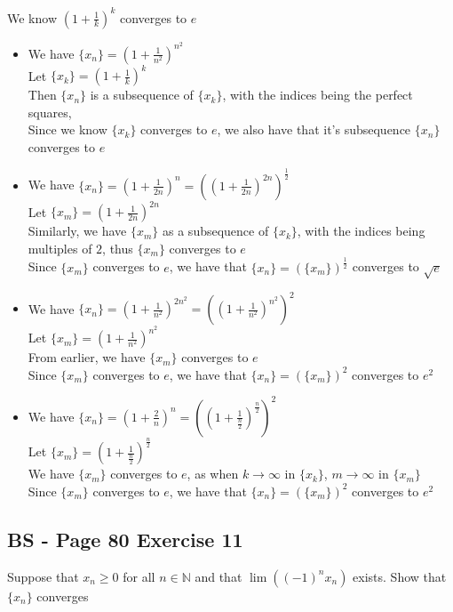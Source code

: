 \documentclass{article}
\begin{document}
We know \((1+\frac{1}{k})^k\) converges to \(e\)
\begin{itemize}
    \item We have \(\{x_n\} = (1+\frac{1}{n^2})^{n^2}\)
    \\
    Let \(\{x_k\} = (1+ \frac{1}{k})^k\) \\
    Then \(\{x_n\}\) is a subsequence of \(\{x_k\}\), with the indices being the perfect squares,
    \\ 
    Since we know \(\{x_k\}\) converges to \(e\), we also have that it's subsequence \(\{x_n\}\) converges to \(e\)

    \item We have \(\{x_n\} = (1+ \frac{1}{2n})^n = ((1+ \frac{1}{2n})^{2n})^{\frac{1}{2}}\)
    \\
    Let \(\{x_m\} = (1+ \frac{1}{2n})^{2n}\)
    \\
    Similarly, we have \(\{x_m\}\) as a subsequence of \(\{x_k\}\), with the indices being
    multiples of \(2\), thus \(\{x_m\}\) converges to \(e\)
    \\
    Since \(\{x_m\}\) converges to \(e\), we have that \(\{x_n\} = (\{x_m\})^{\frac{1}{2}}\) converges to \(\sqrt{e}\)

    \item We have \(\{x_n\} = (1+ \frac{1}{n^2})^{2n^2} = ((1+ \frac{1}{n^2})^{n^2})^{2}\)
    \\
    Let \(\{x_m\} = (1+ \frac{1}{n^2})^{n^2}\)
    \\
    From earlier, we have \(\{x_m\}\) converges to \(e\)
    \\
    Since \(\{x_m\}\) converges to \(e\), we have that \(\{x_n\} = (\{x_m\})^2\) converges to \(e^2\)

    \item We have \(\{x_n\} = (1+ \frac{2}{n})^n = ((1+ \frac{1}{\frac{n}{2}})^{\frac{n}{2}})^2\)
    \\
    Let \(\{x_m\} = (1+ \frac{1}{\frac{n}{2}})^{\frac{n}{2}}\)
    \\
    We have \(\{x_m\}\) converges to \(e\), as when \(k \rightarrow \infty\) in \(\{x_k\}\), 
    \(m \rightarrow \infty\) in \(\{x_m\}\)
    \\
    Since \(\{x_m\}\) converges to \(e\), we have that \(\{x_n\} = (\{x_m\})^{2}\) converges to \(e^2\)
\end{itemize}

\subsection*{BS - Page 80 Exercise 11}
Suppose that \(x_n \geq 0 \) for all \(n \in \mathbb{N}\) and that \(\lim((-1)^n x_n)\)
exists. Show that \(\{x_n\}\) converges
\\
\end{document}
